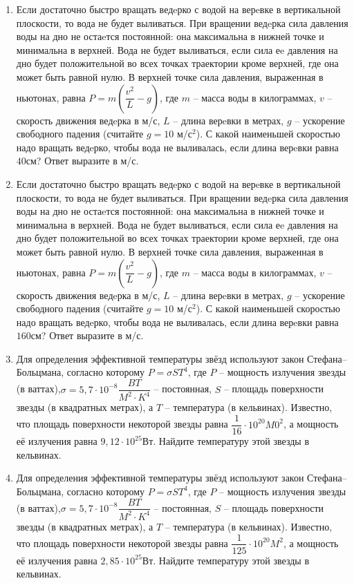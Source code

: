 \documentclass[12pt, a4paper]{article}
\begin{document}
\begin{enumerate}
		\item Если достаточно быстро вращать ведeрко с водой на верeвке в вертикальной плоскости, то вода не будет выливаться. При вращении ведeрка сила давления воды на дно не остаeтся постоянной: она максимальна в нижней точке и минимальна в верхней. Вода не будет выливаться, если сила еe давления на дно будет положительной во всех точках траектории кроме верхней, где она может быть равной нулю. В верхней точке сила давления, выраженная в ньютонах, равна \( P=m\left( \dfrac{v^2}{L}-g \right) \), где \( m \) – масса воды в килограммах, \( v \) – скорость движения ведeрка в м/с, \( L \) – длина верeвки в метрах, \( g \) – ускорение свободного падения (считайте \( g=10 \) м/с\(^2\)). С какой наименьшей скоростью надо вращать ведeрко, чтобы вода не выливалась, если длина верeвки равна \( 40 \)см? Ответ выразите в м/с.
		\item Если достаточно быстро вращать ведeрко с водой на верeвке в вертикальной плоскости, то вода не будет выливаться. При вращении ведeрка сила давления воды на дно не остаeтся постоянной: она максимальна в нижней точке и минимальна в верхней. Вода не будет выливаться, если сила еe давления на дно будет положительной во всех точках траектории кроме верхней, где она может быть равной нулю. В верхней точке сила давления, выраженная в ньютонах, равна \( P=m\left( \dfrac{v^2}{L}-g \right) \), где \( m \) – масса воды в килограммах, \( v \) – скорость движения ведeрка в м/с, \( L \) – длина верeвки в метрах, \( g \) – ускорение свободного падения (считайте \( g=10 \) м/с\(^2\)). С какой наименьшей скоростью надо вращать ведeрко, чтобы вода не выливалась, если длина верeвки равна \( 160 \)см? Ответ выразите в м/с.
		\item Для определения эффективной температуры звёзд используют закон Стефана–Больцмана, согласно которому \( P=\sigma ST^4 \), где \( P \) – мощность излучения звезды (в ваттах),\( \sigma =5,7\cdot10^{-8} \dfrac{BT}{M^2\cdot K^4} \) – постоянная, \( S \) – площадь поверхности звезды (в квадратных метрах), а \( T \) – температура (в кельвинах). Известно, что площадь поверхности некоторой звезды равна \( \dfrac{1}{16}\cdot 10^{20} M	0^2\), а мощность её излучения равна \( 9,12\cdot 10^{25} \)Вт. Найдите температуру этой звезды в кельвинах.
		\item Для определения эффективной температуры звёзд используют закон Стефана–Больцмана, согласно которому \( P=\sigma ST^4 \), где \( P \) – мощность излучения звезды (в ваттах),\( \sigma =5,7\cdot10^{-8} \dfrac{BT}{M^2\cdot K^4} \) – постоянная, \( S \) – площадь поверхности звезды (в квадратных метрах), а \( T \) – температура (в кельвинах). Известно, что площадь поверхности некоторой звезды равна \( \dfrac{1}{125}\cdot 10^{20} M^2\), а мощность её излучения равна \( 2,85 \cdot 10^{25} \)Вт. Найдите температуру этой звезды в кельвинах.

\end{enumerate}
\end{document}
